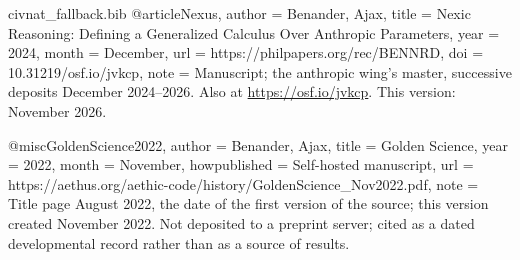\begin{filecontents}[overwrite]{civnat_fallback.bib}
@article{Nexus,
  author      = {Benander, Ajax},
  title       = {Nexic Reasoning: Defining a Generalized Calculus Over Anthropic Parameters},
  year        = {2024},
  month       = {December},
  url         = {https://philpapers.org/rec/BENNRD},
  doi         = {10.31219/osf.io/jvkcp},
  note        = {Manuscript; the anthropic wing's master, successive deposits
                 December 2024--2026. Also at \url{https://osf.io/jvkcp}.
                 This version: November 2026.}
}

@misc{GoldenScience2022,
  author       = {Benander, Ajax},
  title        = {Golden Science},
  year         = {2022},
  month        = {November},
  howpublished = {Self-hosted manuscript},
  url          = {https://aethus.org/aethic-code/history/GoldenScience_Nov2022.pdf},
  note         = {Title page August 2022, the date of the first version of the source; this version created November 2022. Not deposited to a
                  preprint server; cited as a dated developmental record rather than
                  as a source of results.}
}
\end{filecontents}
